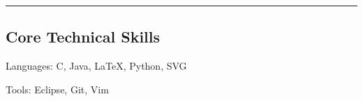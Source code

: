 \documentclass[10pt,letterpaper]{article}
\newenvironment{indentsection}[1]%
{\begin{list}{}%
	{\setlength{\leftmargin}{#1}}%
	\item[]%
}
{\end{list}}
\begin{document}
\hrule
\vspace{-0.4em}
\subsection*{Core Technical Skills}

\begin{indentsection}{\parindent}
\begin{description*}
	\item[Languages:]
	C, Java, \LaTeX, Python, SVG
    \item[Tools:]
    Eclipse, Git, Vim
\end{description*}
\end{indentsection}
\end{document}
